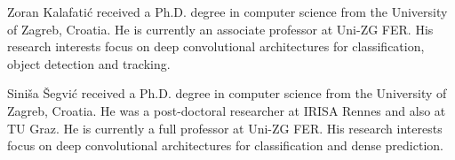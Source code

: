 \documentclass[lettersize,journal,hidelinks]{IEEEtran}
\begin{document}
\begin{IEEEbiographynophoto}{Zoran Kalafatić} received a Ph.D. degree in computer science from the
University of Zagreb, Croatia. He is currently an associate professor at Uni-ZG
FER. His research interests focus on deep convolutional architectures for
classification, object detection and tracking.
\end{IEEEbiographynophoto}

\begin{IEEEbiographynophoto}{Siniša Šegvić} received a Ph.D. degree in computer science from the
University of Zagreb, Croatia. He was a post-doctoral researcher at IRISA
Rennes and also at TU Graz. He is currently a full professor at Uni-ZG
FER. His research interests focus on deep convolutional architectures for
classification and dense prediction.
\end{IEEEbiographynophoto}

\vfill
\end{document}
